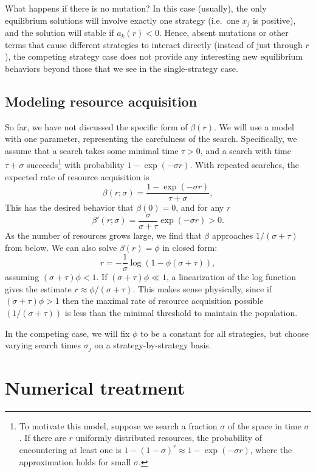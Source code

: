 \documentclass[12pt, leqno]{article} %
\begin{document}
What happens if there is no mutation?  In this case (usually), the
only equilibrium solutions will involve exactly one strategy (i.e.~one
$x_j$ is positive), and the solution will stable if $a_k(r) < 0$.
Hence, absent mutations or other terms that cause different strategies
to interact directly (instead of just through $r$), the competing
strategy case does not provide any interesting new equilibrium
behaviors beyond those that we see in the single-strategy case.

\subsection{Modeling resource acquisition}

So far, we have not discussed the specific form of $\beta(r)$.
We will use a model with one parameter, representing the carefulness
of the search.  Specifically, we assume that a search takes
some minimal time $\tau > 0$, and a search with time $\tau + \sigma$
succeeds\footnote{%
  To motivate this model, suppose we search a fraction $\sigma$
  of the space in time $\sigma$.  If there are $r$ uniformly
  distributed resources, the probability of encountering at least
  one is $1-(1-\sigma)^r \approx 1-\exp(-\sigma r)$, where the
  approximation holds for small $\sigma$.
}
with probability $1-\exp(-\sigma r)$.
With repeated searches, the expected rate of resource acquisition is
\[
  \beta(r; \sigma) = \frac{1-\exp(-\sigma r)}{\tau+\sigma},
\]
This has the desired behavior that $\beta(0) = 0$, and for any $r$
\[
  \beta'(r; \sigma) = \frac{\sigma}{\sigma + \tau} \exp(-\sigma r) > 0.
\]
As the number of resources grows large, we find that
$\beta$ approaches $1/(\sigma+\tau)$ from below.
We can also solve $\beta(r) = \phi$ in closed form:
\[
  r = -\frac{1}{\sigma} \log(1-\phi (\sigma + \tau)),
\]
assuming $(\sigma + \tau) \phi < 1$.  If $(\sigma + \tau) \phi \ll 1$,
a linearization of the log function gives the estimate
$r \approx \phi/(\sigma+\tau)$.
This makes sense physically, since if
$(\sigma + \tau) \phi > 1$ then the maximal rate of resource acquisition
possible $(1/(\sigma+\tau))$ is less than the minimal threshold to maintain
the population.

In the competing case, we will fix $\phi$ to be a constant for all
strategies, but choose varying search times $\sigma_j$ on
a strategy-by-strategy basis.

\section{Numerical treatment}
\end{document}
